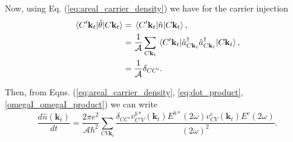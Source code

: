 \documentclass{article}
\newcommand{\kt}{\mathbf{k}_{t}}
\newcommand{\Op}{\hat{\mathcal{\theta}}}
\newcommand{\n}{\hat{n}(\kt)}
\begin{document}
Now, using Eq. (\ref{eq:areal_carrier_density}) we have for the carrier
injection 
\begin{align}
\mel*{C'\kt}{\Op}{C\kt} 
&= \mel*{C'\kt}{\hat{n}}{C\kt} , \nonumber \\
&= \frac{1}{\mathcal{A}} \sum_{C\kt} 
\mel*{C'\kt}{\hat{a}^{\dag}_{C\kt} \hat{a}^{\dag}_{C\kt}}{C\kt} , \nonumber \\
&= \frac{1}{\mathcal{A}} \delta_{CC'} .
\end{align}

Then, from Eqns. (\ref{eq:areal_carrier_density}, \ref{eq:dot_product},
\ref{omegaI_omegaI_product}) we can write 
\begin{equation*}
\frac{d\n}{dt} = \frac{2\pi e^{2}}{\mathcal{A}\hbar^{2}} \sum_{CV\kt}
\frac{\delta_{CC'}v^{b*}_{C'V}(\kt)E^{b*}(2\omega)v^{c}_{CV}(\kt)E^{c}(2\omega)}{(2\omega)^{2}}.
\end{equation*}



\end{document}
